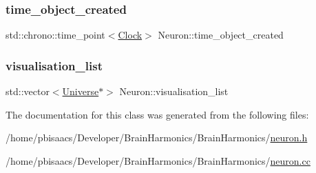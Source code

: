 \mbox{\label{classNeuron_aac5b1f8a26738f915778ebf25183f258}} 
\subsubsection{\texorpdfstring{time\+\_\+object\+\_\+created}{time\_object\_created}}
{\footnotesize\ttfamily std\+::chrono\+::time\+\_\+point$<$\mbox{\hyperlink{universe_8h_a0ef8d951d1ca5ab3cfaf7ab4c7a6fd80}{Clock}}$>$ Neuron\+::time\+\_\+object\+\_\+created\hspace{0.3cm}{\ttfamily [private]}}

\mbox{\label{classNeuron_a00b1e2e5f9d224759df1aa54093092ba}} 
\subsubsection{\texorpdfstring{visualisation\+\_\+list}{visualisation\_list}}
{\footnotesize\ttfamily std\+::vector$<$\mbox{\hyperlink{classUniverse}{Universe}}$\ast$$>$ Neuron\+::visualisation\+\_\+list\hspace{0.3cm}{\ttfamily [protected]}}



The documentation for this class was generated from the following files\+:\begin{DoxyCompactItemize}
\item 
/home/pbisaacs/\+Developer/\+Brain\+Harmonics/\+Brain\+Harmonics/\mbox{\hyperlink{neuron_8h}{neuron.\+h}}\item 
/home/pbisaacs/\+Developer/\+Brain\+Harmonics/\+Brain\+Harmonics/\mbox{\hyperlink{neuron_8cc}{neuron.\+cc}}\end{DoxyCompactItemize}
